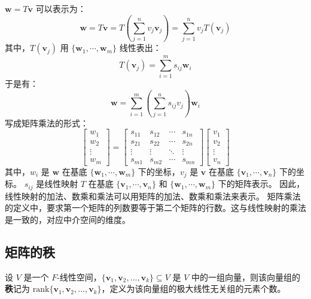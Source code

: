 $\mathbf{w} = T\mathbf{v}$ 可以表示为：
\[
    \mathbf{w} = T\mathbf{v} = T\left(\sum_{j=1}^{n} v_j \mathbf{v}_j\right) = \sum_{j=1}^{n} v_j T(\mathbf{v}_j)
\]
其中，$T(\mathbf{v}_j)$ 用 $\{\mathbf{w}_1,\cdots,\mathbf{w}_m\}$ 线性表出：
\[
    T(\mathbf{v}_j) = \sum_{i=1}^{m} s_{ij} \mathbf{w}_i
\]
于是有：
\[
    \mathbf{w} = \sum_{i=1}^{m} \left(\sum_{j=1}^{n} s_{ij} v_j\right) \mathbf{w}_i
\]
写成矩阵乘法的形式：
\[
    \begin{bmatrix}
        w_1 \\ w_2 \\ \vdots \\ w_m
    \end{bmatrix}
    =
    \begin{bmatrix}
        s_{11} & s_{12} & \cdots & s_{1n} \\
        s_{21} & s_{22} & \cdots & s_{2n} \\
        \vdots & \vdots & \ddots & \vdots \\
        s_{m1} & s_{m2} & \cdots & s_{mn}
    \end{bmatrix}
    \begin{bmatrix}
        v_1 \\ v_2 \\ \vdots \\ v_n
    \end{bmatrix}
\]
其中，$w_i$ 是 $\mathbf{w}$ 在基底 $\{\mathbf{w}_1,\cdots,\mathbf{w}_m\}$ 下的坐标，$v_j$ 是 $\mathbf{v}$ 在基底 $\{\mathbf{v}_1,\cdots,\mathbf{v}_n\}$ 下的坐标。
$s_{ij}$ 是线性映射 $T$ 在基底 $\{\mathbf{v}_1,\cdots,\mathbf{v}_n\}$ 和 $\{\mathbf{w}_1,\cdots,\mathbf{w}_m\}$ 下的矩阵表示。
因此，线性映射的加法、数乘和乘法可以用矩阵的加法、数乘和乘法来表示。
矩阵乘法的定义中，要求第一个矩阵的列数要等于第二个矩阵的行数。这与线性映射的乘法是一致的，对应中介空间的维度。

\vspace{1em}

\subsection{矩阵的秩}

\begin{definition}
    设 $V$ 是一个 $F$-线性空间，$\{\mathbf{v}_1,\mathbf{v}_2,\ldots,\mathbf{v}_k\}\subseteq V$ 是 $V$ 中的一组向量，则该向量组的\textbf{秩}记为 $\mathrm{rank}\{\mathbf{v}_1,\mathbf{v}_2,\ldots,\mathbf{v}_k\}$，定义为该向量组的极大线性无关组的元素个数。
\end{definition}


